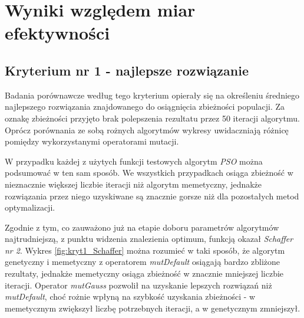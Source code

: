 \FloatBarrier

\section{Wyniki względem miar efektywności}
\subsection{Kryterium nr 1 - najlepsze rozwiązanie}

\par
Badania porównawcze według tego kryterium opierały się na określeniu średniego najlepszego rozwiązania znajdowanego do osiągnięcia zbieżności populacji. Za oznakę zbieżności przyjęto brak polepszenia rezultatu przez 50 iteracji algorytmu. Oprócz porównania ze sobą rożnych algorytmów wykresy uwidaczniają różnicę pomiędzy wykorzystanymi operatorami mutacji. 
\par
W przypadku każdej z użytych funkcji testowych algorytm \emph{PSO} można podsumować w ten sam sposób. We wszystkich przypadkach osiąga zbieżność w nieznacznie większej liczbie iteracji niż algorytm memetyczny, jednakże rozwiązania przez niego uzyskiwane są znacznie gorsze niż dla pozostałych metod optymalizacji. 
\par 
Zgodnie z tym, co zauważono już na etapie doboru parametrów algorytmów  najtrudniejszą, z punktu widzenia znalezienia optimum, funkcją okazał \emph{Schaffer nr 2}. Wykres \ref{fig:kryt1_Schaffer} można rozumieć w taki sposób, że algorytm genetyczny i memetyczny z operatorem \emph{mutDefault} osiągają bardzo zbliżone rezultaty, jednakże memetyczny osiąga zbieżność w znacznie mniejszej liczbie iteracji. Operator \emph{mutGauss} pozwolił na uzyskanie lepszych rozwiązań niż \emph{mutDefault}, choć rożnie wpłyną na szybkość uzyskania zbieżności - w memetycznym zwiększył liczbę potrzebnych iteracji, a w genetycznym zmniejszył. 

